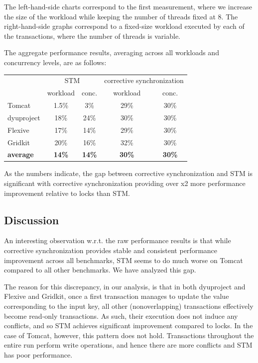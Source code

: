 The left-hand-side charts correspond to the first measurement, where we increase the size of the workload while keeping the number of threads fixed at 8. The right-hand-side graphs correspond to a fixed-size workload executed by each of the transactions, where the number of threads is variable.

The aggregate performance results, averaging across all workloads and concurrency levels, are as follows:
\begin{center}
\begin{tabular}{l|c|c|c|c}
					& \multicolumn{2}{c|}{STM} & \multicolumn{2}{c}{corrective synchronization} \\
					\cline{2-5} 
					& workload & conc. & workload & conc. \\
\hline
Tomcat	  	 &	1.5\%		&	3\% & 29\%		& 30\% \\			   
dyuproject	 & 	18\%		& 	24\%	    & 30\% &	30\%	\\
Flexive 		&	17\%	  &		14\%			& 29\% & 30\%	\\ 
Gridkit 		&	20\% 	&		16\%		& 32\% & 30\%	\\
\hline\hline	
{\bf average} & {\bf 14\%} 	&   {\bf 14\%}    & {\bf 30\%}   & {\bf 30\%} \\
\end{tabular}
\end{center}
As the numbers indicate, the gap between corrective synchronization and STM is significant with corrective synchronization providing over x2 more performance improvement relative to locks than STM.

\subsection{Discussion}

An interesting observation w.r.t. the raw performance results is that while corrective synchronization provides stable and consistent performance improvement across all benchmarks, STM seems to do much worse on Tomcat compared to all other benchmarks. We have analyzed this gap.

The reason for this discrepancy, in our analysis, is that in both dyuproject and Flexive and Gridkit, once a first transaction manages to update the value corresponding to the input key, all other (nonoverlapping) transactions effectively become read-only transactions. As such, their execution does not induce any conflicts, and so STM achieves significant improvement compared to locks. In the case of Tomcat, however, this pattern does not hold. Transactions throughout the entire run perform write operations, and hence there are more conflicts and STM has poor performance.

